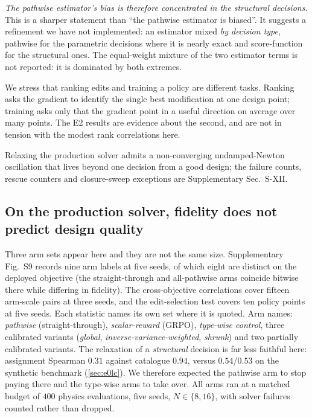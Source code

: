 \documentclass[journal]{IEEEtran}
\begin{document}
\emph{The pathwise estimator's bias is therefore concentrated in the structural
decisions.}  This is a sharper statement than ``the pathwise estimator is biased''.
It suggests a refinement we have not implemented: an estimator mixed \emph{by
decision type}, pathwise for the parametric decisions where it is nearly exact and
score-function for the structural ones.  The equal-weight mixture of the two estimator terms is not reported: it is
dominated by both extremes.

We stress that ranking edits and training a policy are different tasks.  Ranking asks
the gradient to identify the single best modification at one design point; training
asks only that the gradient point in a useful direction on average over many points.
The E2 results are evidence about the second, and are not in tension with the modest
rank correlations here.


Relaxing the production solver admits a non-converging undamped-Newton oscillation
that lives beyond one decision from a good design; the failure counts, rescue
counters and closure-sweep exceptions are Supplementary Sec.~S-XII.

\subsection{On the production solver, fidelity does not predict design quality}
\label{sec:e1lc}
Three arm sets appear here and they are not the same size.  Supplementary
Fig.~S9 records nine arm labels at five seeds, of which eight are distinct on the
deployed objective (the straight-through and all-pathwise arms coincide bitwise
there while differing in fidelity).  The cross-objective correlations cover
fifteen arm-scale pairs at three seeds, and the edit-selection test covers ten
policy points at five seeds.  Each statistic names its own set where it is
quoted.  Arm names: \emph{pathwise} (straight-through), \emph{scalar-reward}
(GRPO), \emph{type-wise control}, three calibrated variants (\emph{global},
\emph{inverse-variance-weighted}, \emph{shrunk}) and two partially calibrated
variants.  The relaxation of a \emph{structural} decision is far less faithful
here: assignment Spearman $0.31$ against catalogue $0.94$, versus $0.54$/$0.53$
on the synthetic benchmark (\cref{sec:e0lc}).  We therefore expected the
pathwise arm to stop paying there and the type-wise arms to take over.  All arms
ran at a matched budget of $400$ physics evaluations, five seeds,
$N\in\{8,16\}$, with solver failures counted rather than dropped.
\end{document}
